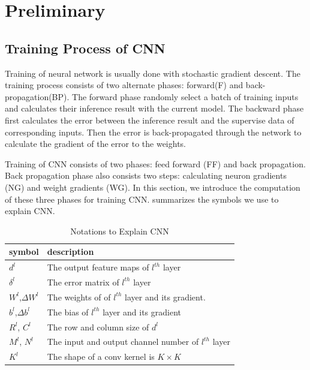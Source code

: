\section{Preliminary}\label{sec:preliminary}

\subsection{Training Process of CNN}
Training of neural network is usually done with stochastic gradient descent. The training process consists of two alternate phases: forward(F) and back-propagation(BP). The forward phase randomly select a batch of training inputs and calculates their inference result with the current model. The backward phase first calculates the error between the inference result and the supervise data of corresponding inputs. Then the error is back-propagated through the network to calculate the gradient of the error to the weights.  

Training of CNN consists of two phases: feed forward (FF) and back propagation. Back propagation phase also consists two steps: calculating neuron gradients (NG) and weight gradients (WG). In this section, we introduce the computation of these three phases for training CNN. summarizes the symbols we use to explain CNN.

\begin{table}[htbp]
    \centering
    \caption{Notations to Explain CNN}
	\begin{tabular}{|l|p{5cm}|}
      \hline
      symbol & description \bigstrut\\
      \hline
      $d ^l$ & The output feature maps of $l^{th}$ layer \bigstrut\\
      \hline
      $\delta ^{l}$ & The error matrix of $l^{th}$ layer \bigstrut\\
      \hline
      $W ^{l}$,$\Delta W^{l}$ & The weights of of $l^{th}$ layer and its gradient. \bigstrut\\
      \hline
      $b ^ l$,$\Delta b ^ l$ & The bias of $l^{th}$ layer and its gradient \bigstrut\\
      \hline
      $ R^l$, $C^l $ & The row and column size of $d ^l$ \bigstrut\\
      \hline
      $ M^l$, $N^l $ & The input and output channel number of $l^{th}$ layer \bigstrut\\
      \hline
      $ K^l $ & The shape of a conv kernel is $K \times K$ \bigstrut\\
      \hline
    \end{tabular}%
    
    \label{tab:Notations}%
  \end{table}%
  
